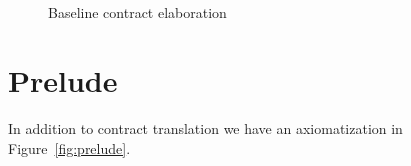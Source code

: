 \documentclass[preprint,nocopyrightspace]{sigplanconf}
\begin{document}
\begin{figure}
\[\begin{array}{c}
\end{array}\]
\caption{Baseline contract elaboration}\label{fig:typing}
\end{figure}


\section{Prelude}
\newcommand{\ys}{\ol{y}}
\newcommand{\Th}[2]{{\cal T}_{#1,#2}}

In addition to contract translation we have an axiomatization in Figure~\ref{fig:prelude}.
\end{document}
